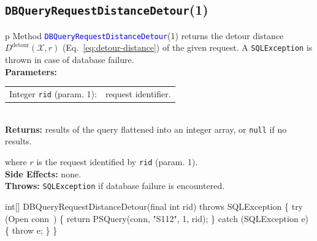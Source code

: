 \subsection{\texttt{DBQueryRequestDistanceDetour}(1)}
\begin{tabular}{p{\textwidth}}
\toprule
{}
Method \textcolor{blue}{{\tt{}\protect{}DBQueryRequestDistanceDetour}}(1) returns the
detour distance $D^\textrm{detour}(\mathcal{X},r)$
(Eq.~\ref{eq:detour-distance}) of the given request.
A {\tt{}SQLException} is thrown in case of database failure.\\
\midrule
\textbf{Parameters:}\\
\begin{tabular}{lp{116mm}}
Integer {\tt{}rid} (param. 1):&request identifier.
\end{tabular}\\
\textbf{Returns:} results of the query flattened into an integer array,
or {\tt{}null} if no results.


where $r$ is the request identified by {\tt{}rid} (param. 1).\\
\textbf{Side Effects:} none.\\
\textbf{Throws:} {\tt{}SQLException} if database failure is encountered.\\
\bottomrule
\end{tabular}
\nwenddocs{}\endmoddef{}
int[] DBQueryRequestDistanceDetour(final int rid) throws SQLException \{
  try (\LA{}Open \code{}conn\edoc{}~{\nwtagstyle{}}\RA{}) \{
    return PSQuery(conn, "S112", 1, rid);
  \} catch (SQLException e) \{
    throw e;
  \}
\}
\eatline
{}\nwendcode{}\nwdocspar
